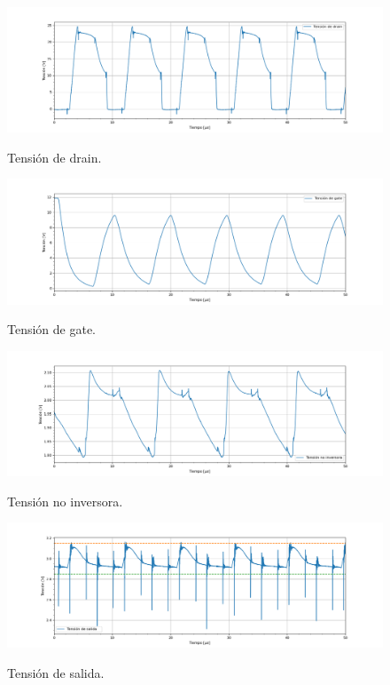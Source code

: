 \begin{figure}[H]
	\centering
	\includegraphics[width=0.9\linewidth]{ImagenesParteIV/Vds.png}
	\label{fig:vds_4}
	\caption{Tensión de drain.}
\end{figure}

\begin{figure}[H]
	\centering
	\includegraphics[width=0.9\linewidth]{ImagenesParteIV/Vgs.png}
	\label{fig:vgs_4}
	\caption{Tensión de gate.}
\end{figure}
\begin{figure}[H]
	\centering
	\includegraphics[width=0.9\linewidth]{ImagenesParteIV/Vni.png}
	\label{fig:vni_4}
	\caption{Tensión no inversora.}
\end{figure}
\begin{figure}[H]
	\centering
	\includegraphics[width=0.9\linewidth]{ImagenesParteIV/Vout.png}
	\label{fig:vout_4}
	\caption{Tensión de salida.}
\end{figure}
